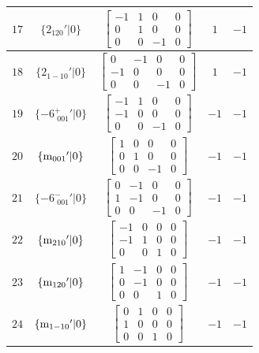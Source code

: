 \documentclass[fleqn,8pt]{jsarticle}
\begin{document}
\begin{longtable}{ccccc}
$ 17 $ & $ \{2{}_{120}{}'|0\} $ & $ \begin{bmatrix} -1 & 1 & 0 & 0 \\ 0 & 1 & 0 & 0 \\ 0 & 0 & -1 & 0 \end{bmatrix} $ & $ 1 $ & $ -1 $ \\ \hline
$ 18 $ & $ \{2{}_{1-10}{}'|0\} $ & $ \begin{bmatrix} 0 & -1 & 0 & 0 \\ -1 & 0 & 0 & 0 \\ 0 & 0 & -1 & 0 \end{bmatrix} $ & $ 1 $ & $ -1 $ \\ \hline
$ 19 $ & $ \{-6^{+}_{\,\,001}{}'|0\} $ & $ \begin{bmatrix} -1 & 1 & 0 & 0 \\ -1 & 0 & 0 & 0 \\ 0 & 0 & -1 & 0 \end{bmatrix} $ & $ -1 $ & $ -1 $ \\ \hline
$ 20 $ & $ \{{\rm m}_{001}{}'|0\} $ & $ \begin{bmatrix} 1 & 0 & 0 & 0 \\ 0 & 1 & 0 & 0 \\ 0 & 0 & -1 & 0 \end{bmatrix} $ & $ -1 $ & $ -1 $ \\ \hline
$ 21 $ & $ \{-6^{-}_{\,\,001}{}'|0\} $ & $ \begin{bmatrix} 0 & -1 & 0 & 0 \\ 1 & -1 & 0 & 0 \\ 0 & 0 & -1 & 0 \end{bmatrix} $ & $ -1 $ & $ -1 $ \\ \hline
$ 22 $ & $ \{{\rm m}_{210}{}'|0\} $ & $ \begin{bmatrix} -1 & 0 & 0 & 0 \\ -1 & 1 & 0 & 0 \\ 0 & 0 & 1 & 0 \end{bmatrix} $ & $ -1 $ & $ -1 $ \\ \hline
$ 23 $ & $ \{{\rm m}_{120}{}'|0\} $ & $ \begin{bmatrix} 1 & -1 & 0 & 0 \\ 0 & -1 & 0 & 0 \\ 0 & 0 & 1 & 0 \end{bmatrix} $ & $ -1 $ & $ -1 $ \\ \hline
$ 24 $ & $ \{{\rm m}_{1-10}{}'|0\} $ & $ \begin{bmatrix} 0 & 1 & 0 & 0 \\ 1 & 0 & 0 & 0 \\ 0 & 0 & 1 & 0 \end{bmatrix} $ & $ -1 $ & $ -1 $ \\
\end{longtable}
\end{document}
